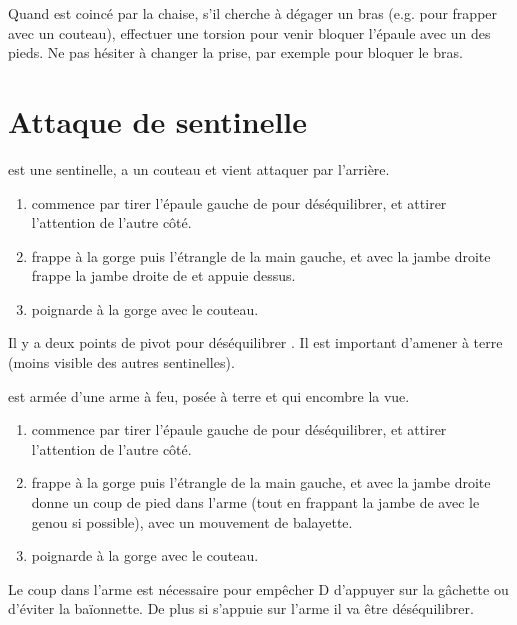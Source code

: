 \begin{technique}
Quand \D est coincé par la chaise, s'il cherche à dégager un bras (e.g. pour frapper avec un couteau), effectuer une torsion pour venir bloquer l'épaule avec un des pieds.
Ne pas hésiter à changer la prise, par exemple pour bloquer le bras.

\end{technique}


\section{Attaque de sentinelle}


\D est une sentinelle, \A a un couteau et vient attaquer \D par l'arrière.


\begin{technique}

\begin{enumerate}
	\item \A commence par tirer l'épaule gauche de \D pour déséquilibrer, et attirer l'attention de l'autre côté.
	
	\item \A frappe \D à la gorge puis l'étrangle de la main gauche, et avec la jambe droite frappe la jambe droite de \D et appuie dessus.
	
	\item \A poignarde \D à la gorge avec le couteau.
\end{enumerate}

Il y a deux points de pivot pour déséquilibrer \D.
Il est important d'amener \D à terre (moins visible des autres sentinelles).

\end{technique}


\begin{technique}

\D est armée d'une arme à feu, posée à terre et qui encombre la vue.

\begin{enumerate}
	\item \A commence par tirer l'épaule gauche de \D pour déséquilibrer, et attirer l'attention de l'autre côté.
	
	\item \A frappe \D à la gorge puis l'étrangle de la main gauche, et avec la jambe droite donne un coup de pied dans l'arme (tout en frappant la jambe de \D avec le genou si possible), avec un mouvement de balayette.
	
	\item \A poignarde \D à la gorge avec le couteau.
\end{enumerate}

Le coup dans l'arme est nécessaire pour empêcher D d'appuyer sur la gâchette ou d'éviter la baïonnette.
De plus si \D s'appuie sur l'arme il va être déséquilibrer.

\end{technique}


